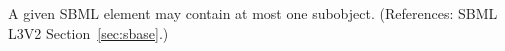 A given SBML element may contain at most one \Annotation subobject.
(References: SBML L3V2 Section~\ref{sec:sbase}.)

